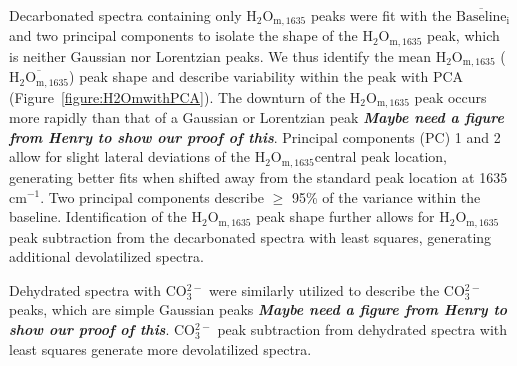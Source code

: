 \documentclass[draft]{agujournal2019}
\begin{document}
Decarbonated spectra containing only $\mathrm{H_2O_{m, 1635}}$ peaks were fit with the $\mathrm{\overline{Baseline}_i}$ and two principal components to isolate the shape of the $\mathrm{H_2O_{m, 1635}}$ peak, which is neither Gaussian nor Lorentzian peaks. We thus identify the mean $\mathrm{H_2O_{m, 1635}}$ ($\mathrm{\overline{H_2O_{m, 1635}}}$) peak shape and describe variability within the peak with PCA (Figure~\ref{figure:H2OmwithPCA}). The downturn of the $\mathrm{H_2O_{m, 1635}}$ peak occurs more rapidly than that of a Gaussian or Lorentzian peak \textbf{\textit{Maybe need a figure from Henry to show our proof of this}}. Principal components (PC) 1 and 2 allow for slight lateral deviations of the $\mathrm{H_2O_{m, 1635}}$central  peak location, generating better fits when shifted away from the standard peak location at 1635 cm$^{-1}$. Two principal components describe $\ge$ 95\% of the variance within the baseline. Identification of the $\mathrm{H_2O_{m, 1635}}$ peak shape further allows for $\mathrm{H_2O_{m, 1635}}$ peak subtraction from the decarbonated spectra with least squares, generating additional devolatilized spectra. 

Dehydrated spectra with CO$_{3}^{2-}$ were similarly utilized to describe the CO$_{3}^{2-}$ peaks, which are simple Gaussian peaks \textbf{\textit{Maybe need a figure from Henry to show our proof of this}}. CO$_{3}^{2-}$ peak subtraction from dehydrated spectra with least squares generate more devolatilized spectra.
\end{document}
